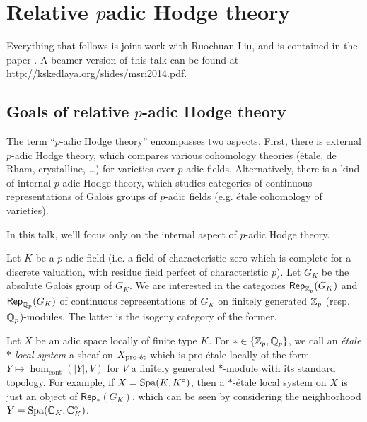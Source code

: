 




\section{Relative \texorpdfstring{$p$}-adic Hodge theory}





Everything that follows is joint work with Ruochuan Liu, and is contained 
in the paper \cite{kl14}. A beamer version of this talk can be found at 
\url{http://kskedlaya.org/slides/msri2014.pdf}. 





\subsection{Goals of relative \texorpdfstring{$p$}{p}-adic Hodge theory}

The term ``$p$-adic Hodge theory'' encompasses two aspects. First, there is 
external $p$-adic Hodge theory, which compares various cohomology theories 
(\'etale, de Rham, crystalline, \ldots) for varieties over $p$-adic fields. 
Alternatively, there is a kind of internal $p$-adic Hodge theory, which studies 
categories of continuous representations of Galois groups of $p$-adic fields 
(e.g. \'etale cohomology of varieties). 

In this talk, we'll focus only on the internal aspect of $p$-adic Hodge theory. 

Let $K$ be a $p$-adic field (i.e. a field of characteristic zero which is complete 
for a discrete valuation, with residue field perfect of characteristic $p$). 
Let $G_K$ be the absolute Galois group of $G_K$. We are interested in the categories 
$\mathsf{Rep}_{\mathbb{Z}_p}(G_K)$ and $\mathsf{Rep}_{\mathbb{Q}_p}(G_K)$ of continuous 
representations of $G_K$ on finitely generated $\mathbb{Z}_p$ (resp. $\mathbb{Q}_p$)-modules. 
The latter is the isogeny category of the former. 

Let $X$ be an adic space locally of finite type $K$. For 
$\ast\in \{\mathbb{Z}_p,\mathbb{Q}_p\}$, we call an \emph{\'etale $\ast$-local system} a 
sheaf on $X_{\textnormal{pro-\'et}}$ which is pro-\'etale locally of the form 
$Y\mapsto \hom_\text{cont}(|Y|,V)$ for $V$ a finitely generated 
$\ast$-module with its standard topology. For example, if $X=\operatorname{Spa}(K,K^\circ)$, then a $\ast$-\'etale local system on $X$ is just an object of 
$\mathsf{Rep}_\ast(G_K)$, which can be seen by considering the 
neighborhood $Y=\operatorname{Spa}(\mathbb{C}_K,\mathbb{C}_K^\circ)$. 

